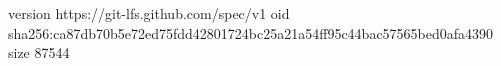 version https://git-lfs.github.com/spec/v1
oid sha256:ca87db70b5e72ed75fdd42801724bc25a21a54ff95c44bac57565bed0afa4390
size 87544
